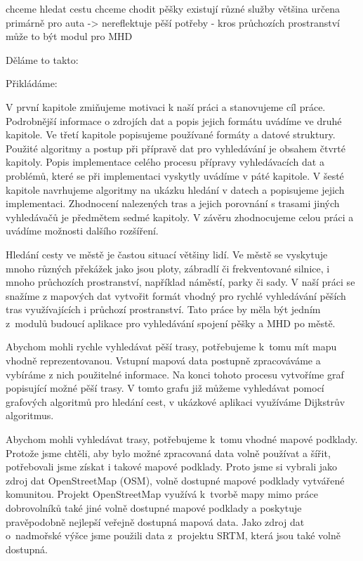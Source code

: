 
chceme hledat cestu
chceme chodit pěšky
existují různé služby
většina určena primárně pro auta -> nereflektuje pěší potřeby
 - kros průchozích prostranství
může to být modul pro MHD


Děláme to takto:


Přikládáme:

V první kapitole zmiňujeme motivaci k naší práci a stanovujeme cíl práce.
Podrobnější informace o zdrojích dat a popis jejich formátu uvádíme ve druhé
kapitole. Ve třetí kapitole popisujeme používané formáty a datové struktury.
Použité algoritmy a postup při přípravě dat pro vyhledávání je obsahem čtvrté
kapitoly. Popis implementace celého procesu přípravy vyhledávacích dat a
problémů, které se při implementaci vyskytly uvádíme v páté kapitole. V šesté
kapitole navrhujeme algoritmy na ukázku hledání v datech a popisujeme jejich
implementaci. Zhodnocení nalezených tras a jejich porovnání s trasami jiných
vyhledávačů je předmětem sedmé kapitoly. V závěru zhodnocujeme celou práci a
uvádíme možnosti dalšího rozšíření.


Hledání cesty ve městě je častou situací většiny lidí. Ve městě se vyskytuje
mnoho různých překážek jako jsou ploty, zábradlí či frekventované silnice,
i mnoho průchozích prostranství, například náměstí, parky či sady. V naší práci
se snažíme z mapových dat vytvořit formát vhodný pro rychlé vyhledávání pěších
tras využívajících i průchozí prostranství. Tato práce by měla být jedním z~modulů
budoucí aplikace pro vyhledávání spojení pěšky a MHD po městě. 

Abychom mohli rychle vyhledávat pěší trasy, potřebujeme k~tomu mít mapu vhodně
reprezentovanou. Vstupní mapová data postupně zpracováváme a vybíráme z nich
použitelné informace. Na konci tohoto procesu vytvoříme graf popisující možné
pěší trasy. V tomto grafu již můžeme vyhledávat pomocí grafových algoritmů pro
hledání cest, v ukázkové aplikaci využíváme Dijkstrův algoritmus. 

Abychom mohli vyhledávat trasy, potřebujeme k~tomu vhodné mapové podklady.
Protože jsme chtěli, aby bylo možné zpracovaná data volně používat a šířit, 
potřebovali jsme získat i takové mapové podklady. Proto jsme si vybrali jako
zdroj dat OpenStreetMap (OSM), volně dostupné mapové podklady vytvářené komunitou. 
Projekt OpenStreetMap využívá k~tvorbě mapy mimo práce dobrovolníků také jiné
volně dostupné mapové podklady a poskytuje pravěpodobně nejlepší veřejně
dostupná mapová data. Jako zdroj dat o~nadmořské výšce jsme použili data
z~projektu SRTM, která jsou také volně dostupná.

